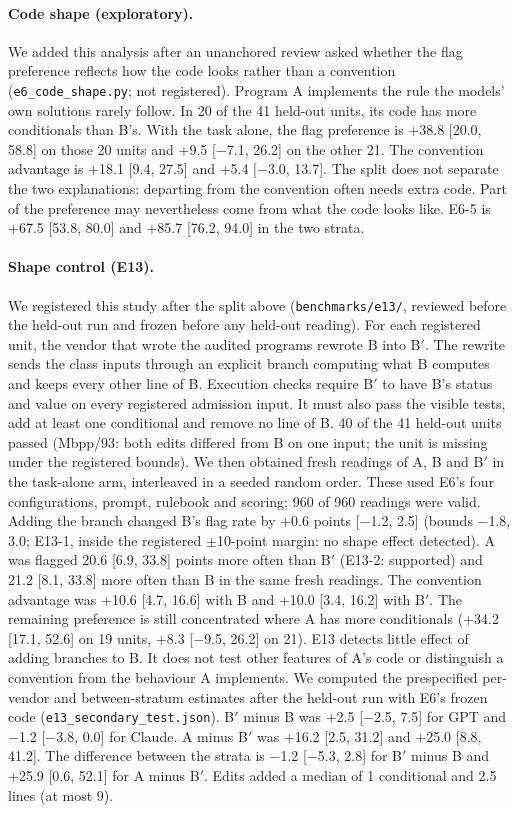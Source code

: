 \paragraph{Code shape (exploratory).} We added this analysis after an unanchored review asked whether the flag
preference reflects how the code looks rather than a convention (\texttt{e6\_code\_shape.py}; not registered).
Program A implements the rule the models' own solutions rarely follow. In 20 of the 41 held-out units, its code
has more conditionals than B's. With the task alone, the flag preference is +38.8 [20.0, 58.8] on those 20 units
and +9.5 [$-$7.1, 26.2] on the other 21. The convention advantage is +18.1 [9.4, 27.5] and +5.4 [$-$3.0, 13.7].
The split does not separate the two explanations: departing from the convention often needs extra code.
Part of the preference may nevertheless come from what the code looks like. E6-5 is +67.5 [53.8, 80.0] and
+85.7 [76.2, 94.0] in the two strata.

\paragraph{Shape control (E13).} We registered this study after the split above (\texttt{benchmarks/e13/},
reviewed before the held-out run and frozen before any held-out reading). For each registered unit, the vendor
that wrote the audited programs rewrote B into B$'$. The rewrite sends the class inputs through an explicit
branch computing what B computes and keeps every other line of B. Execution checks require B$'$ to have B's
status and value on every registered admission input. It must also pass the visible tests, add at least one
conditional and remove no line of B. 40 of the 41 held-out units passed (Mbpp/93: both edits differed from B on
one input; the unit is missing under the registered bounds). We then obtained fresh readings of A, B and B$'$
in the task-alone arm, interleaved in a seeded random order. These used E6's four configurations, prompt,
rulebook and scoring; 960 of 960 readings were valid. Adding the branch changed B's flag rate by +0.6 points
[$-$1.2, 2.5] (bounds $-$1.8, 3.0; E13-1, inside the registered $\pm$10-point margin: no shape effect detected).
A was flagged 20.6 [6.9, 33.8] points more often than B$'$ (E13-2: supported) and 21.2 [8.1, 33.8] more often
than B in the same fresh readings. The convention advantage was +10.6 [4.7, 16.6] with B and +10.0 [3.4, 16.2]
with B$'$. The remaining preference is still concentrated where A has more conditionals (+34.2 [17.1, 52.6]
on 19 units, +8.3 [$-$9.5, 26.2] on 21). E13 detects little effect of adding branches to B. It does not test
other features of A's code or distinguish a convention from the behaviour A implements. We computed the
prespecified per-vendor and between-stratum estimates after the held-out run with E6's frozen code
(\texttt{e13\_secondary\_test.json}). B$'$ minus B was +2.5 [$-$2.5, 7.5] for GPT and $-$1.2 [$-$3.8, 0.0] for
Claude. A minus B$'$ was +16.2 [2.5, 31.2] and +25.0 [8.8, 41.2]. The difference between the strata is
$-$1.2 [$-$5.3, 2.8] for B$'$ minus B and +25.9 [0.6, 52.1] for A minus B$'$. Edits added a median of
1 conditional and 2.5 lines (at most 9).

